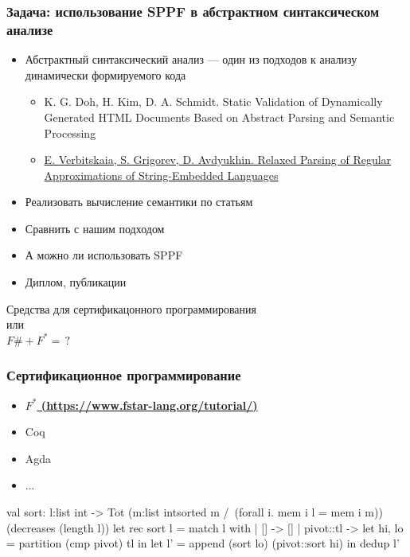 \documentclass{beamer}
\begin{document}
\begin{frame}
  \transwipe[direction=90]
  \frametitle{Задача: использование SPPF в абстрактном синтаксическом анализе}
  \begin{itemize}
    \item Абстрактный синтаксический анализ --- один из подходов к анализу динамически формируемого кода
    \begin{itemize}
        \item K. G. Doh, H. Kim, D. A. Schmidt. Static Validation of Dynamically Generated HTML Documents Based on Abstract Parsing and Semantic Processing
        \item \href{https://github.com/YaccConstructor/articles/blob/master/2015/PSI/paper/psi_2015.pdf}{E. Verbitskaia, S. Grigorev, D. Avdyukhin. Relaxed Parsing of Regular Approximations of String-Embedded Languages}
    \end{itemize} 
    \item Реализовать вычисление семантики по статьям
    \item Сравнить с нашим подходом
    \item А можно ли использовать SPPF
    \item Диплом, публикации
  \end{itemize}
\end{frame}

\begin{frame}[plain,c]
 \transwipe[direction=90]
 \begin{center}
  \Huge Средства для сертификацонного программирования \\ или \\ $F\# + F^* = \, ?$
 \end{center}
\end{frame}

\begin{frame}[fragile]
  \transwipe[direction=90]
  \frametitle{Сертификационное программирование}
  \begin{itemize}
    \item \underline{\bfseries{$F^*$} (\url{https://www.fstar-lang.org/tutorial/})}
    \item Coq
    \item Agda
    \item ...
  \end{itemize}

\begin{pyglist}[language=ocaml,numbers=left,numbersep=5pt]
val sort: l:list int -> 
          Tot (m:list int{sorted m 
                          /\ (forall i. mem i l = mem i m)})
          (decreases (length l))
let rec sort l = match l with
  | [] -> []
  | pivot::tl ->
    let hi, lo = partition (cmp pivot) tl in
    let l' = append (sort lo) (pivot::sort hi) in
    dedup l' 
\end{pyglist}

\begin{verbatim}
\end{verbatim}

\end{frame}
\end{document}
